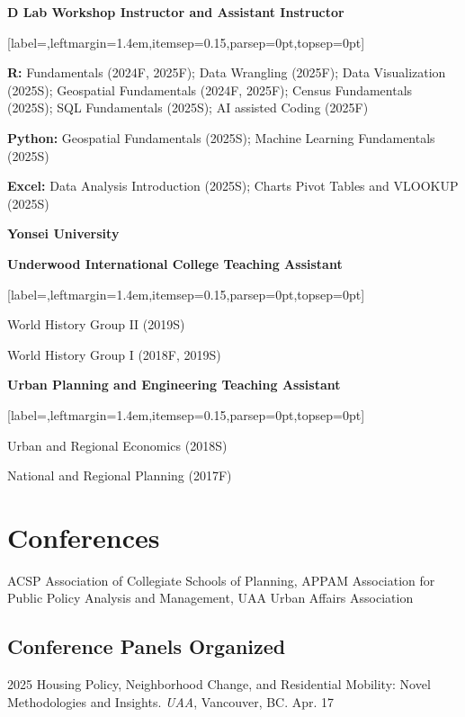 \documentclass[11pt,letterpaper]{article}
\newcommand{\listitemspace}{0.25em}
\renewenvironment{itemize}
{\begin{list}{}{\setlength{\leftmargin}{1em}
\setlength{\parskip}{0pt}
\setlength{\itemsep}{\listitemspace}
\setlength{\parsep}{\listitemspace}}}
{\end{list}}
\newcommand{\term}[1]{(#1)}
\newenvironment{subpoints}{%
  \begin{itemize}[label={},leftmargin=1.4em,itemsep=0.15\baselineskip,parsep=0pt,topsep=0pt]}%
  {\end{itemize}}
\newcommand{\institution}[1]{%
  \par\vspace{0.35\baselineskip}%
  {\sffamily\bfseries\fontsize{12.5}{14}\selectfont #1}\par
  \vspace{0.15\baselineskip}%
}
\newcommand{\role}[1]{{\sffamily\bfseries #1}\par\vspace{0.2\baselineskip}}
\begin{document}
\role{D Lab  Workshop Instructor and Assistant Instructor}
\begin{subpoints}
  \item \textbf{R:} Fundamentals \term{2024F, 2025F}; Data Wrangling \term{2025F}; Data Visualization \term{2025S}; Geospatial Fundamentals \term{2024F, 2025F}; Census Fundamentals \term{2025S}; SQL Fundamentals \term{2025S}; AI assisted Coding \term{2025F}
  \item \textbf{Python:} Geospatial Fundamentals \term{2025S}; Machine Learning Fundamentals \term{2025S}
  \item \textbf{Excel:} Data Analysis Introduction \term{2025S}; Charts Pivot Tables and VLOOKUP \term{2025S}
\end{subpoints}

\institution{Yonsei University}
\role{Underwood International College  Teaching Assistant}
\begin{subpoints}
  \item World History Group II \term{2019S}
  \item World History Group I \term{2018F, 2019S}
\end{subpoints}

\role{Urban Planning and Engineering  Teaching Assistant}
\begin{subpoints}
  \item Urban and Regional Economics \term{2018S}
  \item National and Regional Planning \term{2017F}
\end{subpoints}

\section{Conferences}
ACSP Association of Collegiate Schools of Planning, APPAM Association for Public Policy Analysis and Management, UAA Urban Affairs Association

\subsection{Conference Panels Organized}
\begin{tablist}
  \item[2025] \tab{}Housing Policy, Neighborhood Change, and Residential Mobility: Novel Methodologies and Insights. \emph{UAA}, Vancouver, BC. Apr. 17
\end{tablist}
\end{document}
